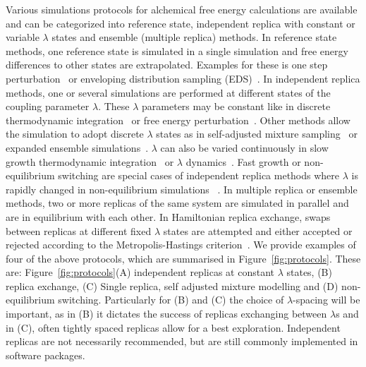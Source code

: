 \documentclass[9pt,bestpractices,pubversion]{livecoms}
\begin{document}
Various simulations protocols for alchemical free energy calculations are available and can be categorized into reference state, independent replica with constant or variable $\lambda$ states and ensemble (multiple replica) methods.
%
In reference state methods, one reference state is simulated in a single simulation and free energy differences to other states are extrapolated. Examples for these is one step perturbation~\cite{zwanzigHighTemperatureEquation1954,liu_estimating_1996,raman_sitespecific_2012,raman_estimation_2017,boresch_convergence_2017} or enveloping distribution sampling (EDS)~\cite{christ_enveloping_2007, christ_multiple_2008,christ_comparison_2009,sidler_efficient_2017,perthold_accelerated_2018}.
%
In independent replica methods, one or several simulations are performed at different states of the coupling parameter $\lambda$. These $\lambda$ parameters may be constant like in discrete thermodynamic integration~\cite{kirkwoodQuantumStatisticsAlmost1933,kirkwoodQuantumStatisticsAlmost1934,kirkwoodStatisticalMechanicsFluid1935} or free energy perturbation~\cite{jorgensen_perspective_2008}. Other methods allow the simulation to adopt discrete $\lambda$ states as in self-adjusted mixture sampling~\cite{tan_optimally_2017} or expanded ensemble simulations~\cite{lyubartsev_new_1992,lyubartsev_free_1994,lyubartsev_determination_1996,escobedo_optimized_2007,escobedo_optimized_2007a}. $\lambda$ can also be varied continuously in slow growth thermodynamic integration~\cite{straatsma_free_1986} or $\lambda$ dynamics~\cite{kong_dynamics_1996,guo_application_2003,knight_ldynamics_2009,knight_multisite_2011,donnini_constant_2011,armacost_biasing_2015,hayes_adaptive_2017}. Fast growth or non-equilibrium switching are special cases of independent replica methods where $\lambda$ is rapidly changed in non-equilibrium simulations ~\cite{jarzynski_nonequilibrium_1997,crooks_pathensemble_2000,hendrix_fast_2001,hummer_fastgrowth_2002}.
%
In multiple replica or ensemble methods, two or more replicas of the same system are simulated in parallel and are in equilibrium with each other. In Hamiltonian replica exchange, swaps between replicas at different fixed $\lambda$ states are attempted and either accepted or rejected according to the Metropolis-Hastings criterion~\cite{sugita_replicaexchange_1999,fukunishi_hamiltonian_2002,zhang_simulating_2016}.
%
We provide examples of four of the above protocols, which are summarised in Figure~\ref{fig:protocols}. These are: Figure~\ref{fig:protocols}(A) independent replicas at constant $\lambda$ states, (B) replica exchange, (C) Single replica, self adjusted mixture modelling and (D) non-equilibrium switching. Particularly for (B) and (C) the choice of $\lambda$-spacing will be important, as in (B) it dictates the success of replicas exchanging between $\lambda$s and in (C), often tightly spaced replicas allow for a best exploration. Independent replicas are not necessarily recommended, but are still commonly implemented in software packages. 
\end{document}
